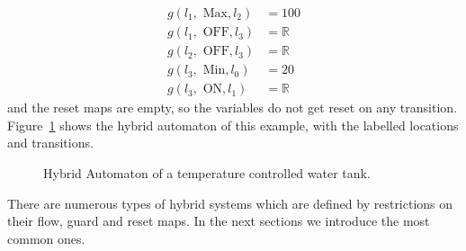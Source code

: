 \begin{ex}
\begin{align*}
    g(l_{1},\text{ Max},l_{2}) &= 100\\
    g(l_{1},\text{ OFF},l_{3}) &= \mathbb{R}\\
    g(l_{2},\text{ OFF},l_{3}) &= \mathbb{R}\\
    g(l_{3},\text{ Min},l_{0}) &= 20 \\
    g(l_{3},\text{ ON},l_{1}) &= \mathbb{R}
\end{align*}
and the reset maps are empty, so the variables do not get reset on any transition.
Figure~\ref{fig:exthermo} shows the hybrid automaton of this example, with the labelled locations and transitions.
\begin{figure}[H]
    \begin{center}
        \caption{Hybrid Automaton of a temperature controlled water tank.}
        \label{fig:exthermo}
    \end{center}
\end{figure}
\end{ex}

There are numerous types of hybrid systems which are defined by restrictions on their flow, guard and reset maps. In the next sections we introduce the most common ones.

